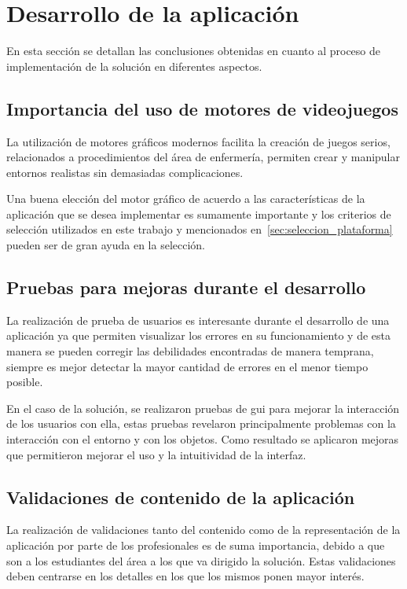 
\section{Desarrollo de la aplicación}

En esta sección se detallan las conclusiones obtenidas en cuanto al proceso de
implementación de la solución en diferentes aspectos.

\subsection{Importancia del uso de motores de videojuegos}

La utilización de motores gráficos modernos facilita la creación de juegos
serios, relacionados a procedimientos del área de enfermería, permiten crear y
manipular entornos realistas sin demasiadas complicaciones. 

Una buena elección del motor gráfico de acuerdo a las características de la
aplicación que se desea implementar es sumamente importante y los criterios de
selección utilizados en este trabajo y mencionados
en~\ref{sec:seleccion_plataforma} pueden ser de gran ayuda en la selección.

\subsection{Pruebas para mejoras durante el desarrollo}

La realización de prueba de usuarios es interesante durante el desarrollo de una
aplicación ya que permiten visualizar los errores en su funcionamiento y de esta
manera se pueden corregir las debilidades encontradas de manera temprana,
siempre es mejor detectar la mayor cantidad de errores en el menor tiempo
posible.

En el caso de la solución, se realizaron pruebas de \Gls{gui} para mejorar la
interacción de los usuarios con ella, estas pruebas revelaron principalmente
problemas con la interacción con el entorno y con los objetos. Como resultado se
aplicaron mejoras que permitieron mejorar el uso y la intuitividad de la
interfaz.

\subsection{Validaciones de contenido de la aplicación}

La realización de validaciones tanto del contenido como de la representación de
la aplicación por parte de los profesionales es de suma importancia, debido a
que son a los estudiantes del área a los que va dirigido la solución. Estas
validaciones deben centrarse en los detalles en los que los mismos ponen mayor
interés.

